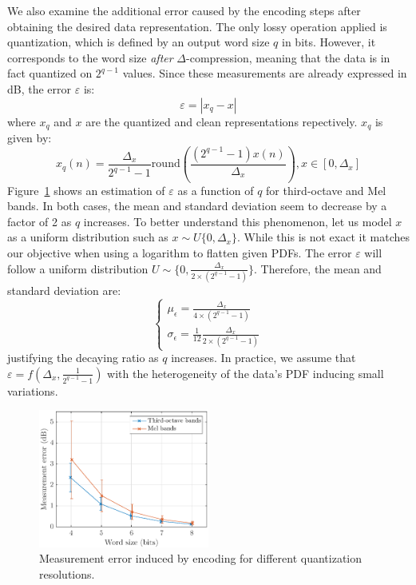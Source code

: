 \documentclass[sensors,article,submit,moreauthors,pdftex,10pt,a4paper]{mdpi}
\begin{document}
We also examine the additional error caused by the encoding steps after obtaining the desired data representation. The only lossy operation applied is quantization, which is defined by an output word size $q$ in bits. However, it corresponds to the word size \textit{after} $\Delta$-compression, meaning that the data is in fact quantized on $2^{q-1}$ values. Since these measurements are already expressed in dB, the error $\varepsilon$ is:
\begin{equation*}
	\varepsilon = |x_q-x|
\end{equation*}
where $x_q$ and $x$ are the quantized and clean representations repectively. $x_q$ is given by:
\begin{equation*}
x_q(n) = \frac{\Delta_x}{2^{q-1}-1}\textrm{round}\left(\frac{(2^{q-1}-1)x(n)}{\Delta_x}\right), x\in \left[0, \Delta_x\right]
\end{equation*}
Figure~\ref{fig:error_q} shows an estimation of $\varepsilon$ as a function of $q$ for third-octave and Mel bands. In both cases, the mean and standard deviation seem to decrease by a factor of 2 as $q$ increases. To better understand this phenomenon, let us model $x$ as a uniform distribution such as $x\sim \textit{U}\{0, \Delta_x\}$. While this is not exact it matches our objective when using a logarithm to flatten given PDFs. The error $\varepsilon$ will follow a uniform distribution $U\sim \{0, \frac{\Delta_x}{2\times (2^{q-1}-1)}\}$. Therefore, the mean and standard deviation are:
\[
\begin{cases}
	\mu_\epsilon = \frac{\Delta_x}{4\times (2^{q-1}-1)}\\
	\sigma_\epsilon = \frac{1}{12}\frac{\Delta_x}{2\times (2^{q-1}-1)}
\end{cases}
\]
justifying the decaying ratio as $q$ increases. In practice, we assume that $\varepsilon = f(\Delta_x, \frac{1}{2^{q-1}-1})$ with the heterogeneity of the data's PDF inducing small variations.

\begin{figure}[htbp]
	\centering
		\includegraphics[width=0.5\textwidth]{figures/error_qall.eps}
	\caption{Measurement error induced by encoding for different quantization resolutions.}
	\label{fig:error_q}
\end{figure}
\end{document}

